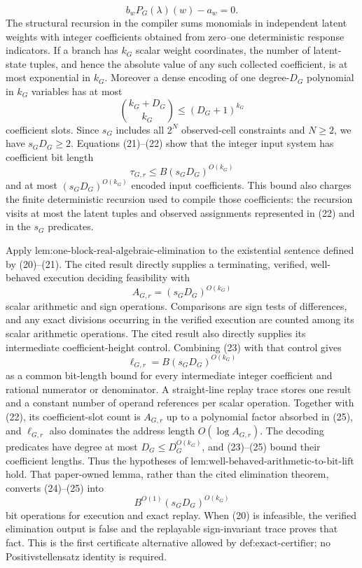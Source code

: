 \[
b_wP_G(\lambda)(w)-a_w=0.
\tag{21}
\]
The structural recursion in the compiler sums monomials in independent latent weights with integer coefficients obtained from zero--one deterministic response indicators.  If a branch has \(k_G\) scalar weight coordinates, the number of latent-state tuples, and hence the absolute value of any such collected coefficient, is at most exponential in \(k_G\).  Moreover a dense encoding of one degree-\(D_G\) polynomial in \(k_G\) variables has at most
\[
\binom{k_G+D_G}{k_G}\le(D_G+1)^{k_G}
\tag{22}
\]
coefficient slots.  Since \(s_G\) includes all \(2^N\) observed-cell constraints and \(N\ge2\), we have \(s_GD_G\ge2\).  Equations (21)--(22) show that the integer input system has coefficient bit length
\[
\tau_{G,r}\le B(s_GD_G)^{O(k_G)}
\tag{23}
\]
and at most \((s_GD_G)^{O(k_G)}\) encoded input coefficients.  This bound also charges the finite deterministic recursion used to compile those coefficients: the recursion visits at most the latent tuples and observed assignments represented in (22) and in the \(s_G\) predicates.

Apply \(\text{lem:one-block-real-algebraic-elimination}\) to the existential sentence defined by (20)--(21).  The cited result directly supplies a terminating, verified, well-behaved execution deciding feasibility with
\[
A_{G,r}=(s_GD_G)^{O(k_G)}
\tag{24}
\]
scalar arithmetic and sign operations.  Comparisons are sign tests of differences, and any exact divisions occurring in the verified execution are counted among its scalar arithmetic operations.  The cited result also directly supplies its intermediate coefficient-height control.  Combining (23) with that control gives
\[
\ell_{G,r}=B(s_GD_G)^{O(k_G)}
\tag{25}
\]
as a common bit-length bound for every intermediate integer coefficient and rational numerator or denominator.  A straight-line replay trace stores one result and a constant number of operand references per scalar operation.  Together with (22), its coefficient-slot count is \(A_{G,r}\) up to a polynomial factor absorbed in (25), and \(\ell_{G,r}\) also dominates the address length \(O(\log A_{G,r})\).  The decoding predicates have degree at most \(D_G\le D_G^{O(k_G)}\), and (23)--(25) bound their coefficient lengths.  Thus the hypotheses of \(\text{lem:well-behaved-arithmetic-to-bit-lift}\) hold.  That paper-owned lemma, rather than the cited elimination theorem, converts (24)--(25) into
\[
B^{O(1)}(s_GD_G)^{O(k_G)}
\tag{26}
\]
bit operations for execution and exact replay.  When (20) is infeasible, the verified elimination output is false and the replayable sign-invariant trace proves that fact.  This is the first certificate alternative allowed by \(\text{def:exact-certifier}\); no Positivstellensatz identity is required.

